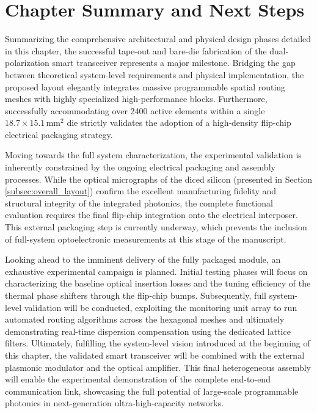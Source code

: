 \section{Chapter Summary and Next Steps}
\label{subsec:ch4_conclusions}

Summarizing the comprehensive architectural and physical design phases detailed in this chapter, 
the successful tape-out and bare-die fabrication of the dual-polarization smart transceiver 
represents a major milestone. Bridging the gap between theoretical system-level requirements and 
physical implementation, the proposed layout elegantly integrates massive programmable spatial 
routing meshes with highly specialized high-performance blocks. Furthermore, successfully 
accommodating over 2400 active elements within a single $18.7 \times 15.1\,\text{mm}^2$ die 
strictly validates the adoption of a high-density flip-chip electrical packaging strategy.

Moving towards the full system characterization, the experimental validation is inherently 
constrained by the ongoing electrical packaging and assembly processes. While the optical 
micrographs of the diced silicon (presented in Section \ref{subsec:overall_layout}) confirm the 
excellent manufacturing fidelity and structural integrity of the integrated photonics, the complete 
functional evaluation requires the final flip-chip integration onto the electrical interposer. 
This external packaging step is currently underway, which prevents the inclusion of full-system 
optoelectronic measurements at this stage of the manuscript.

Looking ahead to the imminent delivery of the fully packaged module, an exhaustive experimental 
campaign is planned. Initial testing phases will focus on characterizing the baseline optical 
insertion losses and the tuning efficiency of the thermal phase shifters through the flip-chip 
bumps. Subsequently, full system-level validation will be conducted, exploiting the monitoring 
unit array to run automated routing algorithms across the hexagonal meshes and ultimately 
demonstrating real-time dispersion compensation using the dedicated lattice filters.
Ultimately, fulfilling the system-level vision introduced at the beginning of this chapter, the 
validated smart transceiver will be combined with the external plasmonic modulator and the 
optical amplifier. This final heterogeneous assembly will enable the experimental demonstration of 
the complete end-to-end communication link, showcasing the full potential of large-scale 
programmable photonics in next-generation ultra-high-capacity networks.
